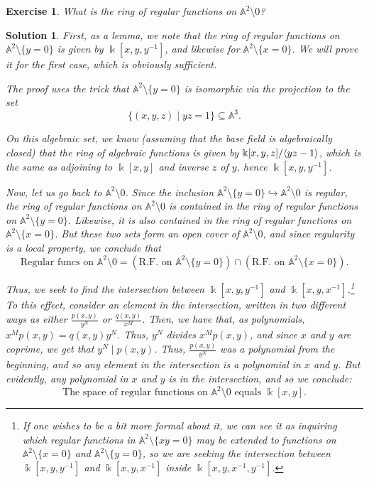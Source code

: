 \documentclass{article}
\newtheorem{ex}{Exercise}
\theoremstyle{nonumberplain}
\newtheorem{sol}{Solution}
\newcommand{\kk}{\Bbbk}
\newcommand{\Aff}{\mathbb{A}}
\DeclarePairedDelimiter{\braket}{\langle}{\rangle}
\begin{document}
\begin{ex}
What is the ring of regular functions on $\Aff^2 \setminus 0$?
\end{ex}

\begin{sol}
First, as a lemma, we note that the ring of regular functions on $\Aff^2 \setminus \{y = 0\}$ is given by $\kk[x,y,y^{-1}]$, and likewise for $\Aff^2 \setminus \{x = 0\}$. We will prove it for the first case, which is obviously sufficient.

The proof uses the trick that $\Aff^2 \setminus \{y = 0\}$ is isomorphic via the projection to the set
\begin{equation}
\{(x,y,z) \mid yz = 1\} \subseteq \Aff^3.
\end{equation}

On this algebraic set, we know (assuming that the base field is algebraically closed) that the ring of algebraic functions is given by $\kk[x,y,z] / \braket{yz-1}$, which is the same as adjoining to $\kk[x,y]$ and inverse $z$ of $y$, hence $\kk[x,y,y^{-1}]$.

Now, let us go back to $\Aff^2 \setminus 0$. Since the inclusion $\Aff^2 \setminus \{y = 0\} \hookrightarrow \Aff^2 \setminus 0$ is regular, the ring of regular functions on $\Aff^2 \setminus 0$ is contained in the ring of regular functions on $\Aff^2 \setminus \{y = 0\}$. Likewise, it is also contained in the ring of regular functions on $\Aff^2 \setminus \{x = 0\}$. But these two sets form an open cover of $\Aff^2 \setminus 0$, and since regularity is a local property, we conclude that
\begin{equation}
\text{Regular funcs on $\Aff^2 \setminus 0$} = (\text{R.F. on $\Aff^2 \setminus \{y=0\}$}) \cap (\text{R.F. on $\Aff^2 \setminus \{x = 0\}$}).
\end{equation}

Thus, we seek to find the intersection between $\kk[x,y,y^{-1}]$ and $\kk[x,y,x^{-1}]$.\footnote{If one wishes to be a bit more formal about it, we can see it as inquiring which regular functions in $\Aff^2 \setminus \{xy = 0\}$ may be extended to functions on $\Aff^2 \setminus \{x=0\}$ and $\Aff^2 \setminus \{y=0\}$, so we are seeking the intersection between $\kk[x,y,y^{-1}]$ and $\kk[x,y,x^{-1}]$ inside $\kk[x,y,x^{-1},y^{-1}]$.} To this effect, consider an element in the intersection, written in two different ways as either $\frac{p(x,y)}{y^N}$ or $\frac{q(x,y)}{x^M}$. Then, we have that, as polynomials, $x^M p(x,y) = q(x,y) y^N$. Thus, $y^N$ divides $x^M p(x,y)$, and since $x$ and $y$ are coprime, we get that $y^N \mid p(x,y)$. Thus, $\frac{p(x,y)}{y^N}$ was a polynomial from the beginning, and so any element in the intersection is a polynomial in $x$ and $y$. But evidently, any polynomial in $x$ and $y$ is in the intersection, and so we conclude:
\begin{equation}
\text{The space of regular functions on $\Aff^2 \setminus 0$ equals $\kk[x,y]$.}
\end{equation}
\end{sol}
\end{document}
